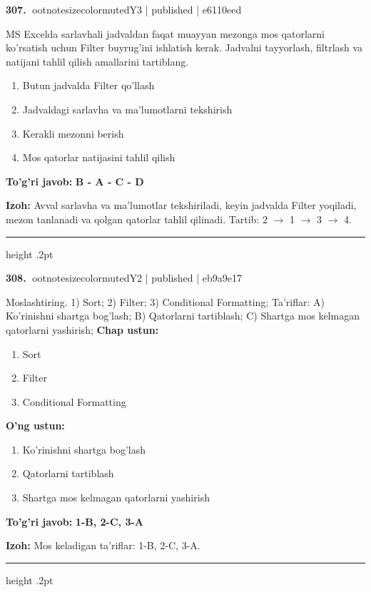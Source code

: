 \documentclass[10pt,a4paper]{article}
\begin{document}
\textbf{\color{ink}307.} {ootnotesizecolor{muted}Y3 | published | e6110eed}
\par
MS Excelda sarlavhali jadvaldan faqat muayyan mezonga mos qatorlarni ko'rsatish uchun Filter buyrug'ini ishlatish kerak. Jadvalni tayyorlash, filtrlash va natijani tahlil qilish amallarini tartiblang.
\begin{enumerate}[label=\Alph*),leftmargin=9mm]
\item Butun jadvalda Filter qo'llash
\item Jadvaldagi sarlavha va ma'lumotlarni tekshirish
\item Kerakli mezonni berish
\item Mos qatorlar natijasini tahlil qilish
\end{enumerate}
\begin{tcolorbox}[enhanced,breakable,colback=teal!4,colframe=teal!55!black,boxrule=0.45pt,arc=1.2mm,left=2.8mm,right=2.8mm,top=2mm,bottom=2mm]
\textbf{\color{teal}To'g'ri javob:} \textbf{B - A - C - D}
\par\smallskip
\textbf{Izoh:} Avval sarlavha va ma'lumotlar tekshiriladi, keyin jadvalda Filter yoqiladi, mezon tanlanadi va qolgan qatorlar tahlil qilinadi. Tartib: 2 \ensuremath{\rightarrow} 1 \ensuremath{\rightarrow} 3 \ensuremath{\rightarrow} 4.
\end{tcolorbox}
\vspace{2mm}\hrule height .2pt\vspace{2mm}

\textbf{\color{ink}308.} {ootnotesizecolor{muted}Y2 | published | eb9a9e17}
\par
Moslashtiring.  1) Sort;  2) Filter;  3) Conditional Formatting;  Ta'riflar: A) Ko'rinishni shartga bog'lash;  B) Qatorlarni tartiblash;  C) Shartga mos kelmagan qatorlarni yashirish;
\textbf{Chap ustun:}\begin{enumerate}[label=\arabic*),leftmargin=9mm]
\item Sort
\item Filter
\item Conditional Formatting
\end{enumerate}
\textbf{O'ng ustun:}\begin{enumerate}[label=\Alph*),leftmargin=9mm]
\item Ko'rinishni shartga bog'lash
\item Qatorlarni tartiblash
\item Shartga mos kelmagan qatorlarni yashirish
\end{enumerate}
\begin{tcolorbox}[enhanced,breakable,colback=teal!4,colframe=teal!55!black,boxrule=0.45pt,arc=1.2mm,left=2.8mm,right=2.8mm,top=2mm,bottom=2mm]
\textbf{\color{teal}To'g'ri javob:} \textbf{1-B, 2-C, 3-A}
\par\smallskip
\textbf{Izoh:} Mos keladigan ta'riflar: 1-B, 2-C, 3-A.
\end{tcolorbox}
\vspace{2mm}\hrule height .2pt\vspace{2mm}
\end{document}
